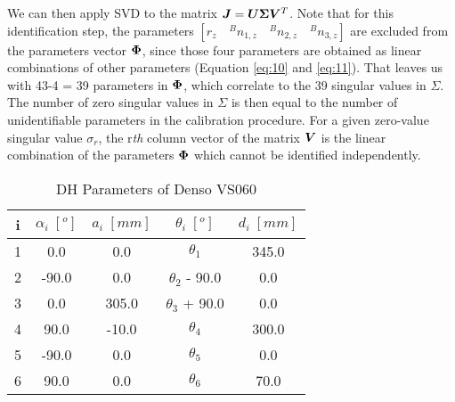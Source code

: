 We can then apply SVD to the matrix $\vb*{J} = \vb*{U}\vb*{\Sigma}\vb*{V}^T $. Note that for this identification step, the parameters $[r_z \quad {^B}n_{1,z}\quad {^B}n_{2,z}\quad {^B}n_{3,z}]$ are excluded from the parameters vector $\vb*{\Phi}$, since those four parameters are obtained as linear combinations of other parameters (Equation \eqref{eq:10} and \eqref{eq:11}). That leaves us with 43-4 = 39 parameters in $\vb*{\Phi}$, which correlate to the 39 singular values in $\Sigma$. The number of zero singular values in $\Sigma$ is then equal to the number of unidentifiable parameters in the calibration procedure. For a given zero-value singular value $\sigma_r$, the r\textit{th} column vector of the matrix $\vb*{V}$ is the linear combination of the parameters $\vb*{\Phi}$ which cannot be identified independently. 


\renewcommand{\arraystretch}{1.1}
\begin{table}[t]
\caption{DH Parameters of Denso VS060}
\label{tab:dh_params}
\centering
\begin{tabular}{c c c c c}
\toprule
i &  \textbf{$\alpha_i \;[^o]$} & \textbf{$a_i \;[mm]$} &  \textbf{$\theta_i \;[^o]$}  & \textbf{$d_i \;[mm]$}\\
\midrule
1 & 0.0 & 0.0 & $\theta_1$ & 345.0\\
2 & -90.0 & 0.0 & $\theta_2$ - 90.0 & 0.0\\
3 & 0.0 & 305.0 & $\theta_3$ + 90.0 & 0.0\\
4 & 90.0 & -10.0 & $\theta_4$ & 300.0\\
5 & -90.0 & 0.0 & $\theta_5$ & 0.0\\
6 & 90.0 & 0.0 & $\theta_6$ & 70.0\\
\bottomrule
\end{tabular}
\end{table}

